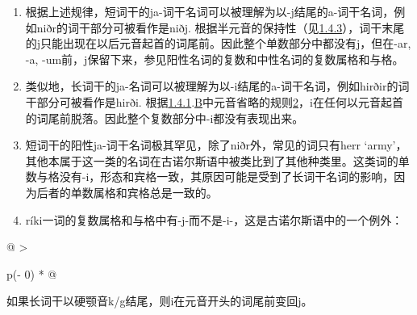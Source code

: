\begin{enumerate}
\def\labelenumi{\arabic{enumi})}
\item
  根据上述规律，短词干的ja-词干名词可以被理解为以-j结尾的a-词干名词，例如niðr的词干部分可被看作是niðj.
  根据半元音的保持性（见\hyperref[ux534aux5143ux97f3ux7684ux4fddux6301ux6027]{1.4.3}），词干末尾的j只能出现在以后元音起首的词尾前。因此整个单数部分中都没有j，但在-ar,
  -a, -um前，j保留下来，参见阳性名词的复数和中性名词的复数属格和与格。
\item
  类似地，长词干的ja-名词可以被理解为以-i结尾的a-词干名词，例如hirðir的词干部分可被看作是hirði.
  根据\hyperref[ux5143ux97f3ux7684ux97f3ux53d8]{1.4.1}.\hyperref[_Ref115693879]{B}中元音省略的规则\hyperref[_Ref115709879]{2}，i在任何以元音起首的词尾前脱落。因此整个复数部分中-i都没有表现出来。
\item
  短词干的阳性ja-词干名词极其罕见，除了niðr外，常见的词只有herr
  `army'，其他本属于这一类的名词在古诺尔斯语中被类比到了其他种类里。这类词的单数与格没有-i，形态和宾格一致，其原因可能是受到了长词干名词的影响，因为后者的单数属格和宾格总是一致的。
\item
  ríki一词的复数属格和与格中有-j-而不是-i-，这是古诺尔斯语中的一个例外：
\end{enumerate}

\begin{longtable}[]{@{}
  >{\raggedright\arraybackslash}p{(\columnwidth - 0\tabcolsep) * }@{}}
\toprule\noalign{}
\begin{minipage}[b]{\linewidth}\raggedright
如果长词干以硬颚音k/g结尾，则i在元音开头的词尾前变回j。
\end{minipage} \\
\midrule\noalign{}
\endhead
\bottomrule\noalign{}
\endlastfoot
\end{longtable}

